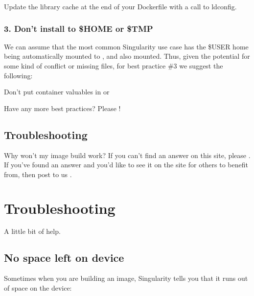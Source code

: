 \documentclass[letterpaper,10pt,english]{sphinxmanual}
\begin{document}
Update the library cache at the end of your Dockerfile with a call
to ldconfig.


\subsection{3. Don’t install to \$HOME or \$TMP}
\label{\detokenize{singularity_and_docker:don-t-install-to-home-or-tmp}}
We can assume that the most common Singularity use case has the \$USER
home being automatically mounted to , and  also mounted. Thus, given
the potential for some kind of conflict or missing files, for best
practice \#3 we suggest the following:

Don’t put container valuables in  or 

Have any more best practices? Please !


\section{Troubleshooting}
\label{\detokenize{singularity_and_docker:troubleshooting}}
Why won’t my image build work? If you can’t find an answer on this site,
please . If you’ve found an answer and you’d like to
see it on the site for others to benefit from, then post to us
.


\chapter{Troubleshooting}
\label{\detokenize{troubleshooting:troubleshooting}}\label{\detokenize{troubleshooting::doc}}
A little bit of help.


\section{No space left on device}
\label{\detokenize{troubleshooting:no-space-left-on-device}}
Sometimes when you are building an image, Singularity tells you that
it runs out of space on the device:

%
\begin{sphinxVerbatim}[commandchars=\\\{\}]
    

 \PYG{p}{[} \PYG{p}{]}     

   
\end{sphinxVerbatim}
\end{document}
